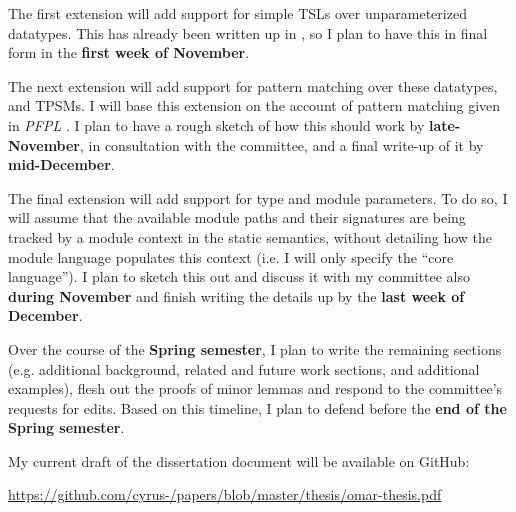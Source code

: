 The first extension will add support for simple TSLs over unparameterized datatypes. This has already been written up in \cite{TSLs}, so I plan to have this in final form in the \textbf{first week of November}.

The next extension will add support for pattern matching over these datatypes, and TPSMs. I will base this extension on the account of pattern matching given in \emph{PFPL} \cite{pfpl}. I plan to have a rough sketch of how this should work by \textbf{late-November}, in consultation with the committee, and a final write-up of it by \textbf{mid-December}.

The final extension will add support for type and module parameters. To do so, I will assume that the available module paths and their signatures are being tracked by a module context in the static semantics, without detailing how the module language populates this context (i.e. I will only specify the ``core language''). I plan to sketch this out and discuss it with my committee also \textbf{during November} and finish writing the details up by the \textbf{last week of December}.

Over the course of the \textbf{Spring semester}, I plan to write the remaining sections (e.g. additional background, related and future work sections, and additional examples), flesh out the proofs of minor lemmas and respond to the committee's requests for edits. Based on this timeline, I plan to defend before the \textbf{end of the Spring semester}.

My current draft of the dissertation document will be available on GitHub:

\url{https://github.com/cyrus-/papers/blob/master/thesis/omar-thesis.pdf}




